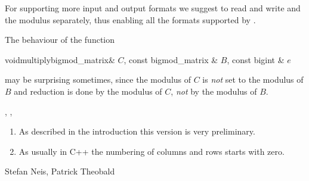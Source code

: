 For supporting more input and output formats we suggest to read and write 
and the modulus separately, thus enabling all the formats supported by .



\WARNINGS

The behaviour of the function

\begin{fcode}{void}{multiply}{bigmod_matrix& $C$, const bigmod_matrix & $B$, const bigint & $e$}
\end{fcode}

may be surprising sometimes, since the modulus of $C$ is \emph{not} set to the modulus of $B$
and reduction is done by the modulus of $C$, \emph{not} by the modulus of $B$.



\SEEALSO

, ,



\NOTES

\begin{enumerate}
\item As described in the introduction this version is very preliminary.

\item As usually in C++ the numbering of columns and rows starts with zero.
\end{enumerate}



\AUTHOR

Stefan Neis, Patrick Theobald
